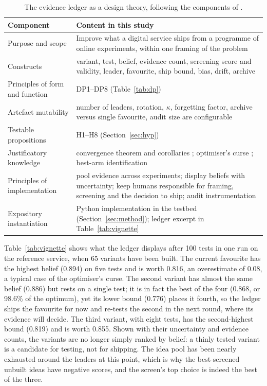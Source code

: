 \documentclass[preprint,12pt,authoryear]{elsarticle}
\theoremstyle{definition}
\begin{document}
\begin{table}[!tbp]
\caption{The evidence ledger as a design theory, following the components of \citet{gregor2007}.}
\label{tab:anatomy}
\centering\footnotesize
\begin{tabularx}{\textwidth}{@{}P{3.4cm}L@{}}
\toprule
Component & Content in this study\\
\midrule
Purpose and scope & Improve what a digital service ships from a programme of online experiments, within one framing of the problem\\
Constructs & variant, test, belief, evidence count, screening score and validity, leader, favourite, ship bound, bias, drift, archive\\
Principles of form and function & DP1--DP8 (Table~\ref{tab:dp})\\
Artefact mutability & number of leaders, rotation, $\kappa$, forgetting factor, archive versus single favourite, audit size are configurable\\
Testable propositions & H1--H8 (Section~\ref{sec:hyp})\\
Justificatory knowledge & convergence theorem and corollaries \citep{kuras2026}; optimiser's curse \citep{smithwinkler2006}; best-arm identification \citep{russo2020}\\
Principles of implementation & pool evidence across experiments; display beliefs with uncertainty; keep humans responsible for framing, screening and the decision to ship; audit instrumentation\\
Expository instantiation & Python implementation in the testbed (Section~\ref{sec:method}); ledger excerpt in Table~\ref{tab:vignette}\\
\bottomrule
\end{tabularx}
\end{table}

Table~\ref{tab:vignette} shows what the ledger displays after 100 tests in one run on the reference service, when 65 variants have been built. The current favourite has the highest belief (0.894) on five tests and is worth 0.816, an overestimate of 0.08, a typical case of the optimiser's curse. The second variant has almost the same belief (0.886) but rests on a single test; it is in fact the best of the four (0.868, or 98.6\% of the optimum), yet its lower bound (0.776) places it fourth, so the ledger ships the favourite for now and re-tests the second in the next round, where its evidence will decide. The third variant, with eight tests, has the second-highest bound (0.819) and is worth 0.855. Shown with their uncertainty and evidence counts, the variants are no longer simply ranked by belief: a thinly tested variant is a candidate for testing, not for shipping. The idea pool has been nearly exhausted around the leaders at this point, which is why the best-screened unbuilt ideas have negative scores, and the screen's top choice is indeed the best of the three.
\end{document}
